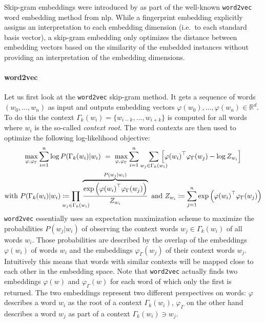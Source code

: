 Skip-gram embeddings were introduced by \citeauthor{Mikolov2013} as part of the well-known \texttt{word2vec}~\cite{Mikolov2013} word embedding method from \ac{nlp}.
While a fingerprint embedding explicitly assigns an interpretation to each embedding dimension (i.e.\ to each standard basis vector), a skip-gram embedding only optimizes the distance between embedding vectors based on the similarity of the embedded instances without providing an interpretation of the embedding dimensions.

\paragraph{word2vec}
Let us first look at the \texttt{word2vec} skip-gram method.
It gets a sequence of words $(w_0, \dots, w_n)$ as input and outputs embedding vectors $\varphi(w_0), \dots, \varphi(w_n) \in \mathbb{R}^d$.
To do this the context $\Gamma_k(w_i) = \{ w_{i-k}, \dots, w_{i + k} \}$ is computed for all words where $w_i$ is the so-called \textit{context root}.
The word contexts are then used to optimize the following log-likelihood objective:
\begin{gather}
	\max_{\varphi, \varphi_{\Gamma}} \sum_{i = 1}^n \log P(\Gamma_k(w_i) | w_i)\ =\ \max_{\varphi, \varphi_{\Gamma}} \sum_{i = 1}^n \smashoperator[r]{\sum_{w_j \in \Gamma_k(w_i)}}\, \left[ {\varphi(w_i)}^\top \varphi_{\Gamma}(w_j) - \log Z_{w_i} \right] \label{eq:related:word2vec}\\
	\text{with } P(\Gamma_k(w_i) | w_i) \coloneqq \prod_{\mathclap{w_j \in \Gamma_k(w_i)}}\, \overbrace{\frac{\exp\left({\varphi(w_i)}^\top \varphi_{\Gamma}(w_j)\right)}{Z_{w_i}}}^{P(w_j | w_i)}
	\text{ and } Z_{w_i} \coloneqq \sum_{j = 1}^n \exp\left({\varphi(w_i)}^\top \varphi_{\Gamma}(w_j)\right) \nonumber
\end{gather}
\texttt{word2vec} essentially uses an expectation maximization scheme to maximize the probabilities $P(w_j | w_i)$ of observing the context words $w_j \in \Gamma_k(w_i)$ of all words $w_i$.
Those probabilities are described by the overlap of the embeddings $\varphi(w_i)$ of words $w_i$ and the embeddings $\varphi_{\Gamma}(w_j)$ of their context words $w_j$.
Intuitively this means that words with similar contexts will be mapped close to each other in the embedding space.
Note that \texttt{word2vec} actually finds two embeddings $\varphi(w)$ and $\varphi_{\Gamma}(w)$ for each word of which only the first is returned.
The two embeddings represent two different perspectives on words: $\varphi$ describes a word $w_i$ as the root of a context $\Gamma_k(w_i)$, $\varphi_{\Gamma}$ on the other hand describes a word $w_j$ as part of a context $\Gamma_k(w_i) \ni w_j$.


